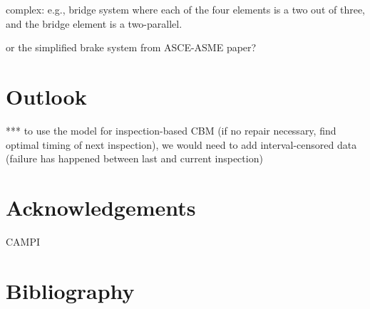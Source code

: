 \documentclass[authoryear]{elsarticle}
\begin{document}
complex: e.g., bridge system where each of the four elements is a two out of three, and the bridge element is a two-parallel.

or the simplified brake system from ASCE-ASME paper?


\section{Outlook}

*** to use the model for inspection-based CBM (if no repair necessary, find optimal timing of next inspection),
we would need to add interval-censored data (failure has happened between last and current inspection)



\section*{Acknowledgements}

CAMPI


\section*{Bibliography}




\end{document}
